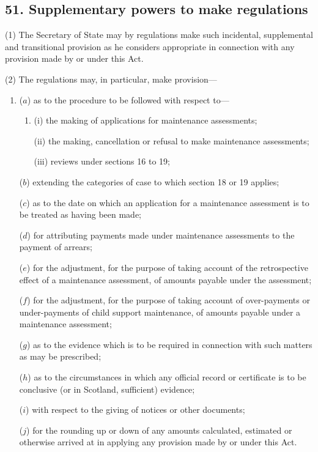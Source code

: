 \documentclass[12pt,a4paper]{article}
\begin{document}
\subsection{51. Supplementary powers to make regulations}

(1) The Secretary of State may by regulations make such incidental, supplemental and transitional provision as he considers appropriate in connection with any provision made by or under this Act.

(2) The regulations may, in particular, make provision—
\begin{enumerate}\item[]
($a$) as to the procedure to be followed with respect to—
\begin{enumerate}\item[]
(i) the making of applications for maintenance assessments;

(ii) the making, cancellation or refusal to make maintenance assessments;

(iii) reviews under sections 16 to 19;

\end{enumerate}

($b$) extending the categories of case to which 
section 18 or 19 
applies;

($c$) as to the date on which an application for a maintenance assessment is to be treated as having been made;

($d$) for attributing payments made under maintenance assessments to the payment of arrears;

($e$) for the adjustment, for the purpose of taking account of the retrospective effect of a maintenance assessment, of amounts payable under the assessment;

($f$) for the adjustment, for the purpose of taking account of over-payments or under-payments of child support maintenance, of amounts payable under a maintenance assessment;

($g$) as to the evidence which is to be required in connection with such matters as may be prescribed;

($h$) as to the circumstances in which any official record or certificate is to be conclusive (or in Scotland, sufficient) evidence;

($i$) with respect to the giving of notices or other documents;

($j$) for the rounding up or down of any amounts calculated, estimated or otherwise arrived at in applying any provision made by or under this Act.
\end{enumerate}
\end{document}
